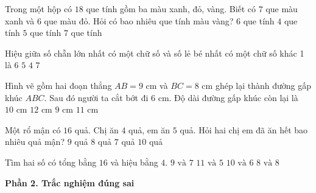 \begin{ex} %
Trong một hộp có $18$ que tính gồm ba màu xanh, đỏ, vàng. Biết có $7$ que màu xanh và $6$ que màu đỏ. Hỏi có bao nhiêu que tính màu vàng?
\choice
{$6$ que tính}
{$4$ que tính}
{\True $5$ que tính}
{$7$ que tính}
\end{ex}

\begin{ex} %
Hiệu giữa số chẵn lớn nhất có một chữ số và số lẻ bé nhất có một chữ số khác 1 là
\choice
{$6$}
{\True $5$}
{$4$}
{$7$}
\end{ex}

\begin{ex} %
Hình vẽ gồm hai đoạn thẳng $AB = 9\text{ cm}$ và $BC = 8\text{ cm}$ ghép lại thành đường gấp khúc $ABC$. Sau đó người ta cắt bớt đi $6\text{ cm}$. Độ dài đường gấp khúc còn lại là
\choice
{$10\text{ cm}$}
{$12\text{ cm}$}
{$9\text{ cm}$}
{\True $11\text{ cm}$}
\end{ex}

\begin{ex} %
Một rổ mận có $16$ quả. Chị ăn $4$ quả, em ăn $5$ quả. Hỏi hai chị em đã ăn hết bao nhiêu quả mận?
\choice
{\True $9$ quả}
{$8$ quả}
{$7$ quả}
{$10$ quả}
\end{ex}

\begin{ex} %
Tìm hai số có tổng bằng $16$ và hiệu bằng $4$.
\choice
{$9\text{ và } 7$}
{$11\text{ và } 5$}
{\True $10\text{ và } 6$}
{$8\text{ và } 8$}
\end{ex}

\textbf{Phần 2. Trắc nghiệm đúng sai}

